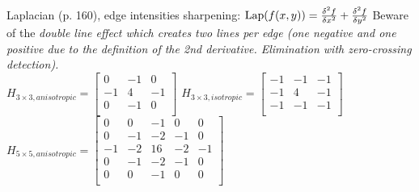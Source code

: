\begin{liste}
  \item Laplacian (p. 160), edge intensities sharpening:  $\operatorname{Lap}(f(x,y)) = \frac{\delta^2f}{\delta x^2} + \frac{\delta^2f}{\delta y^2}$ 
    Beware of the \em double line effect \em which creates two lines per edge (one negative and one 
    positive due to the definition of the 2nd derivative. Elimination with zero-crossing detection).\\
    $H_{3 \times 3, anisotropic} = \begin{bmatrix}
     0 & -1 & 0\\
     -1 & 4 & -1\\
     0 & -1 & 0\\
    \end{bmatrix}$ \quad
      $H_{3 \times 3, isotropic} = \begin{bmatrix}
     -1 & -1 & -1\\
     -1 & 4 & -1\\
     -1 & -1 & -1\\
    \end{bmatrix}$ \quad
    $H_{5 \times 5, anisotropic} = \begin{bmatrix}
     0 & 0 & -1 & 0 & 0\\
     0 & -1 & -2 & -1 & 0\\
     -1 & -2 & 16 & -2 & -1\\
     0 & -1 & -2 & -1 & 0\\
     0 & 0 & -1 & 0 & 0\\
    \end{bmatrix}$
  
\end{liste}


